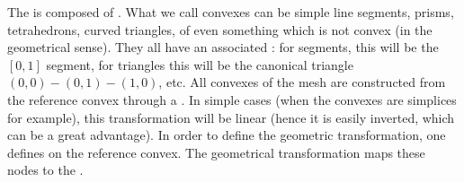 \documentclass[a4paper,11pt,english]{sphinxmanual}
\begin{document}
\sphinxAtStartPar
The  is composed of . What we call convexes can be
simple line segments, prisms, tetrahedrons, curved triangles, of even something
which is not convex (in the geometrical sense). They all have an associated
: for segments, this will be the \([0,1]\) segment,
for triangles this will be the canonical triangle \((0,0)-(0,1)-(1,0)\), etc.
All convexes of the mesh are constructed from the reference convex through a
. In simple cases (when the convexes are
simplices for example), this transformation will be linear (hence it is easily
inverted, which can be a great advantage). In order to define the geometric
transformation, one defines  on the reference convex.
The geometrical transformation maps these nodes to the .
\end{document}
